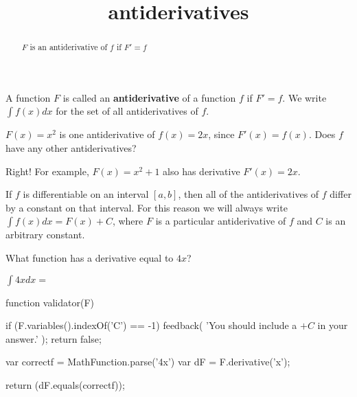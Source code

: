 \documentclass{ximera}
\title{antiderivatives}
\begin{document}
\begin{abstract}
  $F$ is an antiderivative of $f$ if $F'=f$
\end{abstract}

\maketitle

\begin{definition}
	A function $F$ is called an \textbf{antiderivative} of a function $f$ if $F' = f$.  We write $\int f(x) dx$ for the set of all antiderivatives of $f$.
\end{definition}

\begin{question}
	$F(x) = x^2$ is one antiderivative of $f(x) = 2x$, since $F'(x) = f(x)$.  Does $f$ have any other antiderivatives?
\begin{solution}
	 \begin{multipleChoice}
    	\end{multipleChoice}  
  \end{solution}
  
  Right!  For example, $F(x) = x^2+1$ also has derivative $F'(x) = 2x$.
\end{question}

\begin{theorem}
	If $f$ is differentiable on an interval $[a,b]$, then all of the antiderivatives of $f$ differ by a constant on that interval.  For this reason we will always write $\int f(x) dx  = F(x)+C$, where $F$ is a particular antiderivative of $f$ and $C$ is an arbitrary constant.
\end{theorem}

\begin{question}
	\begin{hint}
		What function has a derivative equal to $4x$?
	\end{hint}
 	$\displaystyle \int 4x dx = $ 
	\begin{expression-answer}
 function validator(F) {
   if (F.variables().indexOf('C') == -1) {
     feedback( 'You should include a $+C$ in your answer.' );
     return false;
   }
   
   var correctf = MathFunction.parse('4x')
   var dF = F.derivative('x');
   
   return (dF.equals(correctf));
 }
\end{expression-answer}	
	
\end{question}
\end{document}
